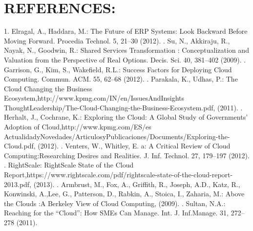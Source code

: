 \documentclass{article}                    %
\begin{document}
\section{REFERENCES: }
1. Elragal, A., Haddara, M.: The Future of ERP Systems: Look Backward Before Moving Forward. Procedia Technol. 5, 21–30 (2012).
. Su, N., Akkiraju, R., Nayak, N., Goodwin, R.: Shared Services Transformation : Conceptualization and Valuation from the Perspective of Real Options. Decis. Sci. 40, 381–402 (2009).
. Garrison, G., Kim, S., Wakefield, R.L.: Success Factors for Deploying Cloud Computing. Commun. ACM. 55, 62–68 (2012).
. Parakala, K., Udhas, P.: The Cloud Changing the Business Ecosystem,http://www.kpmg.com/IN/en/IssuesAndInsights ThoughtLeadership/The-Cloud-Changing-the-Business-Ecosystem.pdf, (2011).
. Herhalt, J., Cochrane, K.: Exploring the Cloud: A Global Study of Governments’ Adoption of Cloud,http://www.kpmg.com/ES/es ActualidadyNovedades/ArticulosyPublicaciones/Documents/Exploring-the-Cloud.pdf, (2012).
. Venters, W., Whitley, E. a: A Critical Review of Cloud Computing:Researching Desires and Realities. J. Inf. Technol. 27, 179–197
(2012).
. RightScale: RightScale State of the Cloud Report,https://www.rightscale.com/pdf/rightscale-state-of-the-cloud-report-2013.pdf,
(2013).
. Armbrust, M., Fox, A., Griffith, R., Joseph, A.D., Katz, R., Konwinski, A.,Lee, G., Patterson, D., Rabkin, A., Stoica, I., Zaharia, M.: Above the Clouds :A Berkeley View of Cloud Computing, (2009).
. Sultan, N.A.: Reaching for the “Cloud”: How SMEs Can Manage. Int. J. Inf.Manage. 31, 272–278 (2011).
\end{document}
